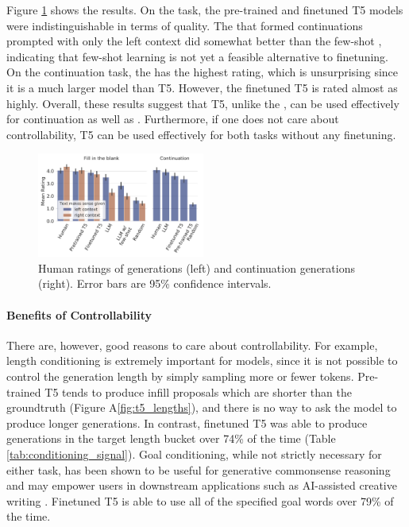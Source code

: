 Figure \ref{fig:human_eval_results} shows the results.
On the \FitB{} task, the pre-trained and finetuned T5 models were indistinguishable in terms of quality.
The \LLM{} that formed continuations prompted with only the left context did somewhat better than the few-shot \LLM{}, indicating that few-shot learning is not yet a feasible alternative to finetuning.
On the continuation task, the \LLM{} has the highest rating, which is unsurprising since it is a much larger model than T5.
However, the finetuned T5 is rated almost as highly.
Overall, these results suggest that T5, unlike the \LLM{}, can be used effectively for continuation as well as \FitB.
Furthermore, if one does not care about controllability, T5 can be used effectively for both tasks without any finetuning.

\begin{figure}[ht]
    \centering
    \includegraphics[width=0.49\textwidth, trim={0 0.55cm 0 0}, clip]{figures/human_eval}
    \caption{Human ratings of \FitB{} generations (left) and continuation generations (right). Error bars are 95\% confidence intervals.}
    \label{fig:human_eval_results}
\end{figure}

\paragraph{Benefits of Controllability}
There are, however, good reasons to care about controllability.
For example, length conditioning is extremely important for \FitB models, since it is not possible to control the generation length by simply sampling more or fewer tokens.
Pre-trained T5 tends to produce infill proposals which are shorter than the groundtruth (Figure A\ref{fig:t5_lengths}), and there is no way to ask the model to produce longer generations.
In contrast, finetuned T5 was able to produce generations in the target length bucket over 74\% of the time (Table \ref{tab:conditioning_signal}).
Goal conditioning, while not strictly necessary for either task, has been shown to be useful for generative commonsense reasoning \citep{lin2020commongen} and may empower users in downstream applications such as AI-assisted creative writing \citep{roemmele2021inspiration}. 
Finetuned T5 is able to use all of the specified goal words over 79\% of the time.


